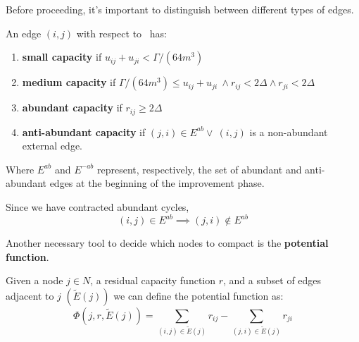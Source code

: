 Before proceeding, it’s important to distinguish between different types of edges.
\begin{definition}
    An edge $(i,j)$ with respect to \gmm\ has:
    \begin{enumerate}
        \item \textbf{small capacity} if $u_{ij}+u_{ji} < \Gamma/(64m^3)$
        \item \label{media}\textbf{medium capacity} if $\Gamma/(64m^3) \le u_{ij}+u_{ji}\ \land r_{ij} < 2\Delta \land r_{ji} < 2\Delta $
        \item \textbf{abundant capacity} if $r_{ij} \ge 2\Delta$ 
        \item \textbf{anti-abundant capacity} if $(j,i) \in E^{ab} \lor\ (i,j)$ is a non-abundant external edge.
    \end{enumerate}
    Where $E^{ab}$ and $E^{-ab}$ represent, respectively, the set of abundant and anti-abundant edges at the beginning of the improvement phase.

   
    
\end{definition}
\begin{obs}
    Since we have contracted abundant cycles, \[(i,j)\in E^{ab}\implies (j,i)\not \in E^{ab}\]
\end{obs}


Another necessary tool to decide which nodes to compact is the \textbf{potential function}.
\begin{definition}

    Given a node $j\in N$, a residual capacity function $r$, and a subset of edges adjacent to $j$ $(\tilde{E}(j))$  we can define the potential function as:
    \[\Phi (j, r, \tilde{E}(j)) = \sum_{(i,j)\in \tilde{E}(j)} r_{ij}-\sum_{(j,i)\in \tilde{E}(j)} r_{ji}\] 
\end{definition}

